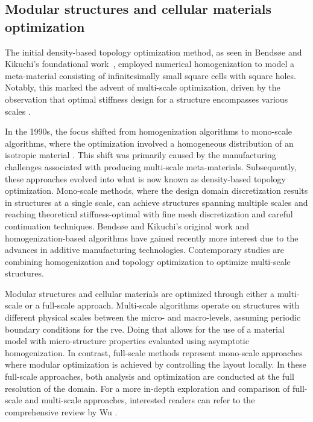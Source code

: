 \subsection{Modular structures and cellular materials optimization}
The initial density-based topology optimization method, as seen in Bendsøe and Kikuchi's foundational work~, employed numerical homogenization to model a meta-material consisting of infinitesimally small square cells with square holes. Notably, this marked the advent of multi-scale optimization, driven by the observation that optimal stiffness design for a structure encompasses various scales .

In the 1990s, the focus shifted from homogenization algorithms to mono-scale algorithms, where the optimization involved a homogeneous distribution of an isotropic material . This shift was primarily caused by the manufacturing challenges associated with producing multi-scale meta-materials. Subsequently, these approaches evolved into what is now known as density-based topology optimization. Mono-scale methods, where the design domain discretization results in structures at a single scale, can achieve structures spanning multiple scales and reaching theoretical stiffness-optimal with fine mesh discretization and careful continuation techniques. Bendsøe and Kikuchi's original work and homogenization-based algorithms have gained recently more interest due to the advances in additive manufacturing technologies. Contemporary studies are combining homogenization and topology optimization to optimize multi-scale structures. 

Modular structures and cellular materials are optimized through either a multi-scale or a full-scale approach. Multi-scale algorithms operate on structures with different physical scales between the micro- and macro-levels, assuming periodic boundary conditions for the \gls{rve}. Doing that allows for the use of a material model with micro-structure properties evaluated using asymptotic homogenization. In contrast, full-scale methods represent mono-scale approaches where modular optimization is achieved by controlling the layout locally. In these full-scale approaches, both analysis and optimization are conducted at the full resolution of the domain. For a more in-depth exploration and comparison of full-scale and multi-scale approaches, interested readers can refer to the comprehensive review by Wu \etal {}.

